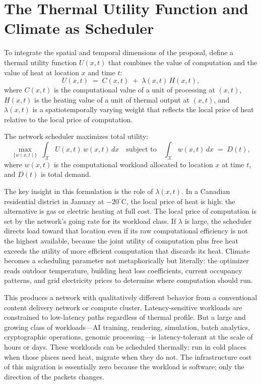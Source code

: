 \documentclass[12pt, oneside]{article}
\begin{document}
\section{The Thermal Utility Function and Climate as Scheduler}

To integrate the spatial and temporal dimensions of the proposal, define a thermal utility function $U(x,t)$ that combines the value of computation and the value of heat at location $x$ and time $t$:
\[
U(x,t) \;=\; C(x,t) \;+\; \lambda(x,t)\, H(x,t),
\]
where $C(x,t)$ is the computational value of a unit of processing at $(x,t)$, $H(x,t)$ is the heating value of a unit of thermal output at $(x,t)$, and $\lambda(x,t)$ is a spatiotemporally varying weight that reflects the local price of heat relative to the local price of computation.

The network scheduler maximizes total utility:
\[
\max_{\{w(x,t)\}} \;\int_{\mathcal{X}} U(x,t)\, w(x,t)\, dx \quad \text{subject to} \quad \int_{\mathcal{X}} w(x,t)\, dx \;=\; D(t),
\]
where $w(x,t)$ is the computational workload allocated to location $x$ at time $t$, and $D(t)$ is total demand.

The key insight in this formulation is the role of $\lambda(x,t)$. In a Canadian residential district in January at $-20^{\circ}$C, the local price of heat is high: the alternative is gas or electric heating at full cost. The local price of computation is set by the network's going rate for its workload class. If $\lambda$ is large, the scheduler directs load toward that location even if its raw computational efficiency is not the highest available, because the joint utility of computation plus free heat exceeds the utility of more efficient computation that discards its heat. Climate becomes a scheduling parameter not metaphorically but literally: the optimizer reads outdoor temperature, building heat loss coefficients, current occupancy patterns, and grid electricity prices to determine where computation should run.

This produces a network with qualitatively different behavior from a conventional content delivery network or compute cluster. Latency-sensitive workloads are constrained to low-latency paths regardless of thermal profile. But a large and growing class of workloads---AI training, rendering, simulation, batch analytics, cryptographic operations, genomic processing---is latency-tolerant at the scale of hours or days. These workloads can be scheduled thermally: run in cold places when those places need heat, migrate when they do not. The infrastructure cost of this migration is essentially zero because the workload is software; only the direction of the packets changes.
\end{document}
